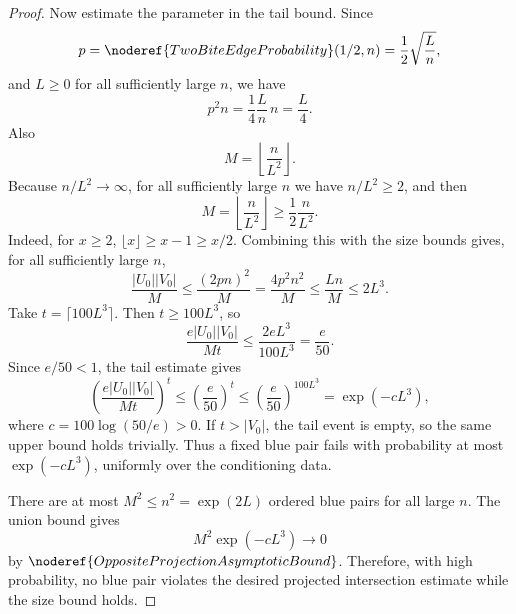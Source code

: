 \begin{proof}
Now estimate the parameter in the tail bound.  Since
\[
p=\noderef{TwoBiteEdgeProbability}(1/2,n)
=\frac12\sqrt{\frac{L}{n}},
\]
and \(L\ge0\) for all sufficiently large \(n\), we have
\[
p^2n=\frac14\frac{L}{n}\,n=\frac{L}{4}.
\]
Also
\[
M=\left\lfloor\frac{n}{L^2}\right\rfloor .
\]
Because \(n/L^2\to\infty\), for all sufficiently large \(n\) we have
\(n/L^2\ge2\), and then
\[
M=\left\lfloor\frac{n}{L^2}\right\rfloor
\ge \frac12\frac{n}{L^2}.
\]
Indeed, for \(x\ge2\), \(\lfloor x\rfloor\ge x-1\ge x/2\).  Combining this
with the size bounds gives, for all sufficiently large \(n\),
\[
\frac{|U_0||V_0|}{M}
\le \frac{(2pn)^2}{M}
=\frac{4p^2n^2}{M}
\le \frac{Ln}{M}
\le 2L^3.
\]
Take \(t=\lceil100L^3\rceil\).  Then \(t\ge100L^3\), so
\[
\frac{e|U_0||V_0|}{Mt}
\le \frac{2eL^3}{100L^3}
=\frac e{50}.
\]
Since \(e/50<1\), the tail estimate gives
\[
\left(\frac{e|U_0||V_0|}{Mt}\right)^t
\le \left(\frac e{50}\right)^t
\le \left(\frac e{50}\right)^{100L^3}
=\exp(-cL^3),
\]
where \(c=100\log(50/e)>0\).  If \(t>|V_0|\), the tail event is empty, so the
same upper bound holds trivially.  Thus a fixed blue pair fails with
probability at most \(\exp(-cL^3)\), uniformly over the conditioning data.

There are at most \(M^2\le n^2=\exp(2L)\) ordered blue pairs for all large
\(n\).  The union bound gives
\[
M^2\exp(-cL^3)\to0
\]
by \(\noderef{OppositeProjectionAsymptoticBound}\).  Therefore, with high
probability, no blue pair violates the desired projected intersection estimate
while the size bound holds.
\end{proof}
